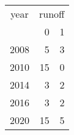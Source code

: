 \footnotesize\begin{tabular}[t]{lrr}
\toprule
\multicolumn{1}{c}{year} & \multicolumn{2}{c}{runoff} \\
\cmidrule(l{3pt}r{3pt}){1-1} \cmidrule(l{3pt}r{3pt}){2-3}
  & 0 & 1\\
\midrule
2008 & 5 & 3\\
2010 & 15 & 0\\
2014 & 3 & 2\\
2016 & 3 & 2\\
2020 & 15 & 5\\
\bottomrule
\end{tabular}
